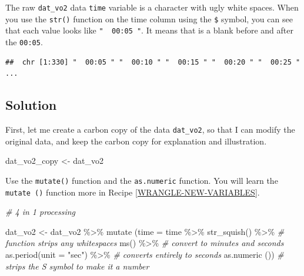 \documentclass[
]{book}
\newenvironment{Shaded}{\begin{snugshade}}{\end{snugshade}}
\newcommand{\AttributeTok}[1]{\textcolor[rgb]{0.77,0.63,0.00}{#1}}
\newcommand{\CommentTok}[1]{\textcolor[rgb]{0.56,0.35,0.01}{\textit{#1}}}
\newcommand{\FunctionTok}[1]{\textcolor[rgb]{0.00,0.00,0.00}{#1}}
\newcommand{\NormalTok}[1]{#1}
\newcommand{\OtherTok}[1]{\textcolor[rgb]{0.56,0.35,0.01}{#1}}
\newcommand{\SpecialCharTok}[1]{\textcolor[rgb]{0.00,0.00,0.00}{#1}}
\newcommand{\StringTok}[1]{\textcolor[rgb]{0.31,0.60,0.02}{#1}}
\begin{document}
The raw \texttt{dat\_vo2} data \texttt{time} variable is a character with ugly white spaces. When you use the \texttt{str()} function on the time column using the \texttt{\$} symbol, you can see that each value looks like \texttt{"\ \ 00:05\ "}. It means that is a blank before and after the \texttt{00:05}.

\begin{Shaded}
\end{Shaded}

\begin{verbatim}
##  chr [1:330] "  00:05 " "  00:10 " "  00:15 " "  00:20 " "  00:25 " ...
\end{verbatim}

\hypertarget{solution-3}{%
\subsection{Solution}\label{solution-3}}

First, let me create a carbon copy of the data \texttt{dat\_vo2}, so that I can modify the original data, and keep the carbon copy for explanation and illustration.

\begin{Shaded}
\begin{Highlighting}[]
\NormalTok{dat\_vo2\_copy }\OtherTok{\textless{}{-}}\NormalTok{ dat\_vo2 }
\end{Highlighting}
\end{Shaded}

Use the \texttt{mutate()} function and the \texttt{as.numeric} function. You will learn the \texttt{mutate\ ()} function more in Recipe \ref{WRANGLE-NEW-VARIABLES}.

\begin{Shaded}
\begin{Highlighting}[]
\CommentTok{\# 4 in 1 processing}

\NormalTok{dat\_vo2 }\OtherTok{\textless{}{-}}\NormalTok{ dat\_vo2 }\SpecialCharTok{\%\textgreater{}\%}
  \FunctionTok{mutate}\NormalTok{ (}\AttributeTok{time =}\NormalTok{ time }\SpecialCharTok{\%\textgreater{}\%} 
            \FunctionTok{str\_squish}\NormalTok{() }\SpecialCharTok{\%\textgreater{}\%} \CommentTok{\# function strips any whitespaces}
            \FunctionTok{ms}\NormalTok{() }\SpecialCharTok{\%\textgreater{}\%} \CommentTok{\# convert to minutes and seconds}
            \FunctionTok{as.period}\NormalTok{(}\AttributeTok{unit =} \StringTok{"sec"}\NormalTok{) }\SpecialCharTok{\%\textgreater{}\%} \CommentTok{\# converts entirely to seconds}
            \FunctionTok{as.numeric}\NormalTok{ ()) }\CommentTok{\# strips the S symbol to make it a number}
\end{Highlighting}
\end{Shaded}
\end{document}
